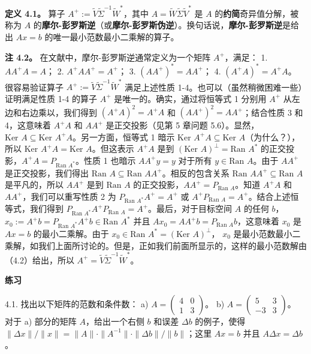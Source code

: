 \textbf{定义 4.1。} 算子 $A^+ := \tilde{V} \tilde{\Sigma}^{-1} \tilde{W}^*$，其中 $A = \tilde{W} \tilde{\Sigma} \tilde{V}^*$ 是 $A$ 的\textbf{约简}奇异值分解，被称为 $A$ 的\textbf{摩尔-彭罗斯逆}（或\textbf{摩尔-彭罗斯伪逆}）。换句话说，\textbf{摩尔-彭罗斯逆}是给出 $Ax = b$ 的唯一最小范数最小二乘解的算子。

\textbf{注 4.2。} 在文献中，摩尔-彭罗斯逆通常定义为一个矩阵 $A^+$，满足：
1. $AA^+A = A$；
2. $A^+AA^+ = A^+$；
3. $(AA^+)^* = AA^+$；
4. $(A^+A)^* = A^+A$。
很容易验证算子 $A^+ := \tilde{V} \tilde{\Sigma}^{-1} \tilde{W}^*$ 满足上述性质 1-4。也可以（虽然稍微困难一些）证明满足性质 1-4 的算子 $A^+$ 是唯一的。确实，通过将恒等式 1 分别用 $A^+$ 从左边和右边乘以，我们得到 $(A^+A)^2 = A^+A$ 和 $(AA^+)^2 = AA^+$；结合性质 3 和 4，这意味着 $A^+A$ 和 $AA^+$ 是正交投影（见第 5 章问题 5.6）。显然，$\text{Ker } A \subseteq \text{Ker } A^+A$。另一方面，恒等式 1 暗示 $\text{Ker } A^+A \subseteq \text{Ker } A$（为什么？），所以 $\text{Ker } A^+A = \text{Ker } A$。但这表示 $A^+A$ 是到 $(\text{Ker } A)^\perp = \text{Ran } A^*$ 的正交投影，$A^+A = P_{\text{Ran } A^*}$。性质 1 也暗示 $AA^+y = y$ 对于所有 $y \in \text{Ran } A$。由于 $AA^+$ 是正交投影，我们得出 $\text{Ran } A \subseteq \text{Ran } AA^+$。相反的包含关系 $\text{Ran } AA^+ \subseteq \text{Ran } A$ 是平凡的，所以 $AA^+$ 是到 $\text{Ran } A$ 的正交投影，$AA^+ = P_{\text{Ran } A}$。知道 $A^+A$ 和 $AA^+$，我们可以重写性质 2 为 $P_{\text{Ran } A^*} A^+ = A^+$ 或 $A^+ P_{\text{Ran } A} = A^+$。结合上述恒等式，我们得到 $P_{\text{Ran } A^*} A^+ P_{\text{Ran } A} = A^+$。最后，对于目标空间 $A$ 的任何 $b$， $x_0 := A^+b = P_{\text{Ran } A^*} A^+ b \in \text{Ran } A^*$ 并且 $Ax_0 = AA^+ b = P_{\text{Ran } A} b$，这意味着 $x_0$ 是 $Ax = b$ 的最小二乘解。由于 $x_0 \in \text{Ran } A^* = (\text{Ker } A)^\perp$， $x_0$ 是最小范数最小二乘解，如我们上面所讨论的。但是，正如我们前面所显示的，这样的最小范数解由（4.2）给出，所以 $A^+ = \tilde{V} \tilde{\Sigma}^{-1} \tilde{W}^*$。

\textbf{练习}~

4.1. 找出以下矩阵的范数和条件数：
a) $A = \begin{pmatrix} 4 & 0 \\ 1 & 3 \end{pmatrix}$。
b) $A = \begin{pmatrix} 5 & 3 \\ -3 & 3 \end{pmatrix}$。
对于 a) 部分的矩阵 $A$，给出一个右侧 $b$ 和误差 $\Delta b$ 的例子，使得 $\|\Delta x\|/\|x\| = \|A\| \cdot \|A^{-1}\| \cdot \|\Delta b\|/\|b\|$；这里 $Ax = b$ 并且 $A \Delta x = \Delta b$。

